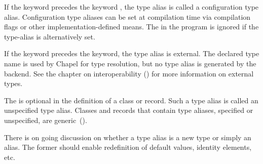 If the keyword  precedes the keyword , the
type alias is called a configuration type alias.  Configuration type
aliases can be set at compilation time via compilation flags or other
implementation-defined means.  The  in the
program is ignored if the type-alias is alternatively set.

If the keyword  precedes the  keyword, the type alias is
external.  The declared type name is used by Chapel for type resolution, but no
type alias is generated by the backend.  See the chapter on interoperability
() for more information on external types.

The  is optional in the definition of a class or
record.  Such a type alias is called an unspecified type
alias. Classes and records that contain type aliases, specified or
unspecified, are generic~().

\begin{openissue}
There is on going discussion on whether a type alias is a new
type or simply an alias.  The former should enable redefinition of
default values, identity elements, etc.
\end{openissue}
